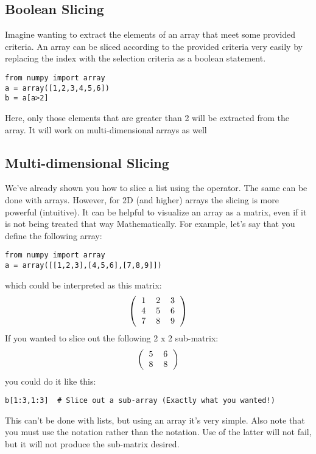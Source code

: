\subsection*{Boolean Slicing}
Imagine wanting to extract the elements of an array that meet some
provided criteria.  An array can be sliced according to the provided
criteria very easily by replacing the index with the selection
criteria as a boolean statement.
\begin{Verbatim}
from numpy import array
a = array([1,2,3,4,5,6])
b = a[a>2]
\end{Verbatim}
Here, only those elements that are greater than 2 will be extracted
from the array.  It will work on multi-dimensional arrays as well

\subsection*{Multi-dimensional Slicing}
We've already shown you how to slice a list using the \code{:}
operator.  The same can be done with arrays.  However, for 2D (and
higher) arrays the slicing is more powerful (intuitive).  It can be
helpful to visualize an array as a matrix, even if it is not being
treated that way Mathematically.  For example, let's say that you
define the following array:
\begin{Verbatim}
from numpy import array
a = array([[1,2,3],[4,5,6],[7,8,9]])
\end{Verbatim}
which could be interpreted as this matrix:
\begin{equation}
\left( \begin{tabular}{ccc}
1 & 2 & 3\\
4 & 5 & 6\\
7 & 8 & 9\\
\end{tabular}
\right)
\end{equation}
If you wanted to slice out the following 2 x 2 sub-matrix:
\begin{equation}
\left(\begin{tabular}{cc}
5 & 6 \\
8 & 8 \\
\end{tabular}
\right)
\end{equation}
you could do it like this:
\begin{Verbatim}
b[1:3,1:3]  # Slice out a sub-array (Exactly what you wanted!)
\end{Verbatim}
This can't be done with lists, but using an array it's very simple.
Also note that you must use the \code{[x1:y1,x2:y2]} notation rather
than the \code{[x1:y1][x2:y2]} notation.  Use of the latter will not
fail, but it will not produce the sub-matrix desired.
